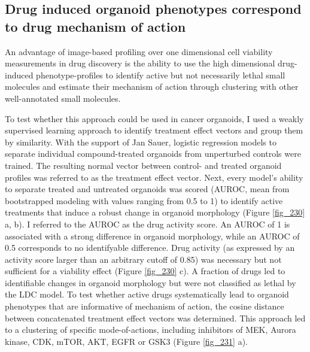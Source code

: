 \begin{flushleft}
\section{Drug induced organoid phenotypes correspond to drug mechanism of action}

An advantage of image-based profiling over one dimensional cell viability measurements in drug discovery is the ability to use the high dimensional drug-induced phenotype-profiles to identify active but not necessarily lethal small molecules and estimate their mechanism of action through clustering with other well-annotated small molecules. 

\bigbreak
To test whether this approach could be used in cancer organoids, I used a weakly supervised learning approach to identify treatment effect vectors and group them by similarity. With the support of Jan Sauer, logistic regression models to separate individual compound-treated organoids from unperturbed controls were trained. The resulting normal vector between control- and treated organoid profiles was referred to as the treatment effect vector. Next, every model’s ability to separate treated and untreated organoids was scored (AUROC, mean from bootstrapped modeling with values ranging from 0.5 to 1) to identify active treatments that induce a robust change in organoid morphology (Figure \ref{fig_230} a, b). I referred to the AUROC as the drug activity score. An AUROC of 1 is associated with a strong difference in organoid morphology, while an AUROC of 0.5 corresponds to no identifyable difference. Drug activity (as expressed by an activity score larger than an arbitrary cutoff of 0.85) was necessary but not sufficient for a viability effect (Figure \ref{fig_230} c). A fraction of drugs led to identifiable changes in organoid morphology but were not classified as lethal by the LDC model. To test whether active drugs systematically lead to organoid phenotypes that are informative of mechanism of action, the cosine distance between concatenated treatment effect vectors was determined. This approach led to a clustering of specific mode-of-actions, including inhibitors of MEK, Aurora kinase, CDK, mTOR, AKT, EGFR or GSK3 (Figure \ref{fig_231} a). 


\end{flushleft}
